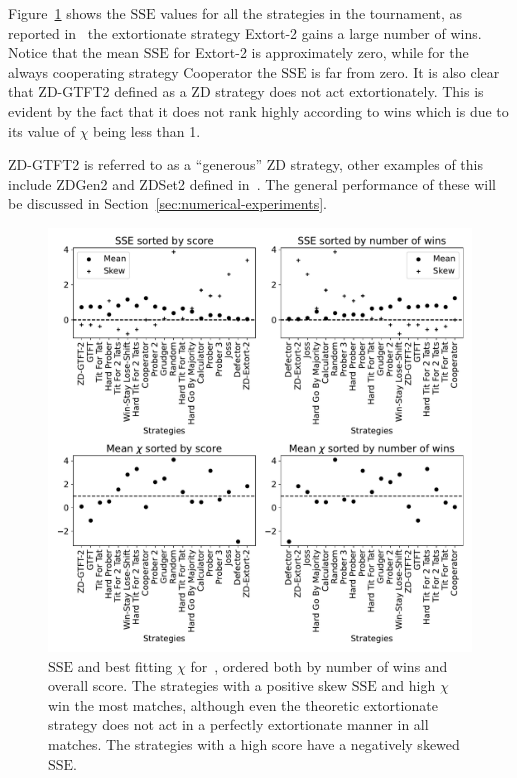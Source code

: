 \documentclass[a4paper]{article}
\newcommand{\SSe}{\text{SSE}}
\begin{document}
Figure~\ref{fig:sserror_in_stewart_plotkin} shows the
\(\SSe\) values for all the strategies in the tournament, as
reported in~\cite{Stewart2012} the extortionate strategy Extort-2 gains a large number of
wins. Notice that the mean \(\SSe\) for Extort-2 is approximately zero, while for
the always cooperating strategy Cooperator the \(\SSe\) is far from zero. It is
also clear that ZD-GTFT2 defined as a ZD strategy does not act
extortionately. This is evident by the fact that it does not rank highly according
to wins which is due to its value of \(\chi\) being less than 1.

ZD-GTFT2 is referred to as a ``generous'' ZD strategy, other examples of this
include ZDGen2 and ZDSet2 defined in~\cite{sep-prisoner-dilemma}. The
general performance of these will be discussed in
Section~\ref{sec:numerical-experiments}.

\begin{figure}[!htbp]
    \centering
    \includegraphics[width=.8\textwidth]{./assets/img/sserror_in_stewart_plotkin/main.pdf}
    \caption{\(\SSe\) and best fitting \(\chi\) for~\cite{Stewart2012},
        ordered both by number of wins and overall score.
        The strategies with a positive skew
        \(\SSe\) and high \(\chi\) win the most matches, although even the
        theoretic
        extortionate strategy does not act in a perfectly extortionate manner in
        all matches. The strategies with a high score have a negatively skewed
        \(\SSe\).
        }
    \label{fig:sserror_in_stewart_plotkin}
\end{figure}
\end{document}
